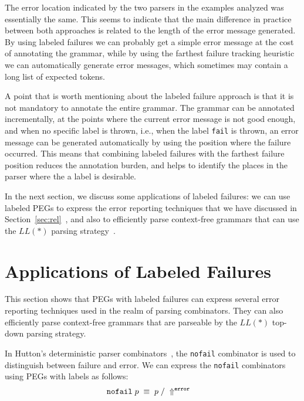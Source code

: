 \documentclass[3p,12pt,singlecolumn]{elsarticle}
\newcommand{\throw}{\Uparrow}
\begin{document}
The error location indicated by the two parsers in the examples
analyzed was essentially the same. This seems to indicate that
the main difference in practice between both approaches is related
to the length of the error message generated. By using labeled
failures we can probably get a simple error message at the cost
of annotating the grammar, while by using the farthest failure
tracking heuristic we can automatically generate error messages,
which sometimes may contain a long list of expected tokens.

A point that is worth mentioning about the labeled failure approach
is that it is not mandatory to annotate the entire grammar. The grammar
can be annotated incrementally, at the points where the current error
message is not good enough, and when no specific label is thrown, i.e.,
when the label \texttt{fail} is thrown, an error message can be
generated automatically by using the position where the failure
occurred. This means that combining labeled failures with the farthest
failure position reduces the annotation burden, and helps to
identify the places in the parser where the a label is desirable.

In the next
section, we discuss some applications of labeled failures:
we can use labeled PEGs to express the error
reporting techniques that we have discussed in
Section~\ref{sec:rel}~\cite{hutton1992hfp,rojemo1995epc,partridge1996fv,leijen2001parsec}, and also to efficiently parse
context-free grammars that can use the
$LL(*)$ parsing strategy~\cite{parr2011llstar}.


\section{Applications of Labeled Failures}
\label{sec:labelsrelated}

This section shows that PEGs with labeled failures can express
several error reporting techniques used in the realm of parsing
combinators. They can also efficiently parse
context-free grammars that
are parseable by the $LL(*)$ top-down parsing strategy.

In Hutton's deterministic parser combinators~\cite{hutton1992hfp}, the \texttt{nofail}
combinator is used to distinguish between failure and error.
We can express the \texttt{nofail} combinators using PEGs with labels
as follows:
\begin{align*}
{\tt nofail} \; p & \; \equiv \; p \; / \; \throw^{\tt error}
\end{align*}
\end{document}
